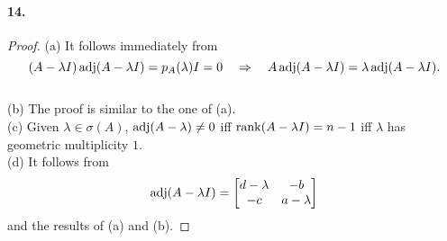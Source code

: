   \paragraph{14.}
  \begin{proof}
    \noindent
    (a) It follows immediately from
    \[
      (A-\lambda I)\operatorname{adj}(A-\lambda I)=p_A(\lambda)I=0 \quad\Rightarrow\quad
      A\operatorname{adj}(A-\lambda I) = \lambda\operatorname{adj}(A-\lambda I).
    \] \\
    (b) The proof is similar to the one of (a).\\
    (c) Given $\lambda\in\sigma(A)$, $\operatorname{adj}(A-\lambda)\ne 0$ iff $\operatorname{rank}(A-\lambda
    I)=n-1$ iff $\lambda$ has geometric multiplicity $1$.\\
    (d) It follows from 
    \[
      \operatorname{adj}(A-\lambda I) = 
      \begin{bmatrix} d-\lambda & -b \\ -c & a-\lambda \end{bmatrix}
    \]
    and the results of (a) and (b).
  \end{proof}

